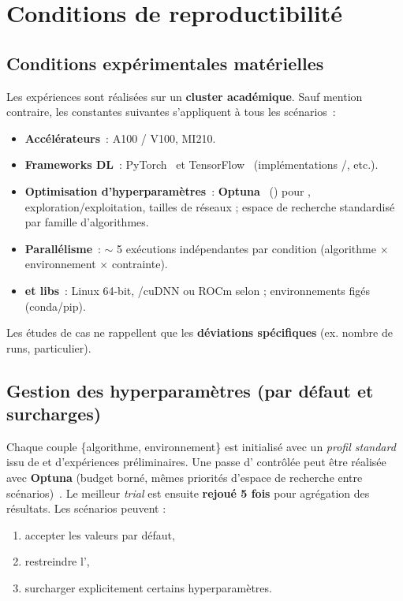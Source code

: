 \section{Conditions de reproductibilité}

\subsection{Conditions expérimentales matérielles}
\label{par:compute_conditions}
Les expériences sont réalisées sur un \textbf{cluster  académique}. Sauf mention contraire, les constantes suivantes s'appliquent à tous les scénarios~:
\begin{itemize}
  \item \textbf{Accélérateurs}~:  A100 / V100,  MI210.
  \item \textbf{Frameworks DL}~: PyTorch~\cite{Paszke2019} et TensorFlow~\cite{Abadi2016} (implémentations /, etc.).
  \item \textbf{Optimisation d'hyperparamètres}~: \textbf{Optuna}~\cite{akiba2019optuna} () pour , exploration/exploitation, tailles de réseaux ; espace de recherche standardisé par famille d'algorithmes.
  \item \textbf{Parallélisme}~: $\sim$ 5 exécutions indépendantes par condition (algorithme $\times$ environnement $\times$ contrainte).
  \item \textbf{ et libs}~: Linux 64-bit, /cuDNN ou ROCm selon  ; environnements figés (conda/pip).
\end{itemize}
Les études de cas ne rappellent que les \textbf{déviations spécifiques} (ex. nombre de runs,  particulier).

\subsection{Gestion des hyperparamètres (par défaut et surcharges)}
Chaque couple \{algorithme, environnement\} est initialisé avec un \textit{profil standard} issu de  et d'expériences préliminaires.
Une passe d' contrôlée peut être réalisée avec \textbf{Optuna} (budget borné, mêmes priorités d'espace de recherche entre scénarios)~\cite{akiba2019optuna}. Le meilleur \textit{trial} est ensuite \textbf{rejoué 5 fois} pour agrégation des résultats.
Les scénarios peuvent :
\begin{enumerate}[label=\alph*)]
  \item accepter les valeurs par défaut,
  \item restreindre l',
  \item surcharger explicitement certains hyperparamètres.
\end{enumerate}

